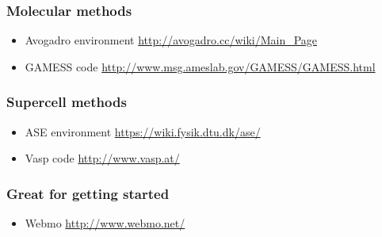\documentclass[11pt]{article}
\begin{document}
\subsubsection{Molecular methods}
\label{sec:org34c4d5a}
\begin{itemize}
\item Avogadro environment \url{http://avogadro.cc/wiki/Main\_Page}
\item GAMESS code \url{http://www.msg.ameslab.gov/GAMESS/GAMESS.html}
\end{itemize}

\subsubsection{Supercell methods}
\label{sec:orgd231664}
\begin{itemize}
\item ASE environment \url{https://wiki.fysik.dtu.dk/ase/}
\item Vasp code \url{http://www.vasp.at/}
\end{itemize}

\subsubsection{Great for getting started}
\label{sec:orga768c9d}
\begin{itemize}
\item Webmo \url{http://www.webmo.net/}
\end{itemize}
\end{document}
